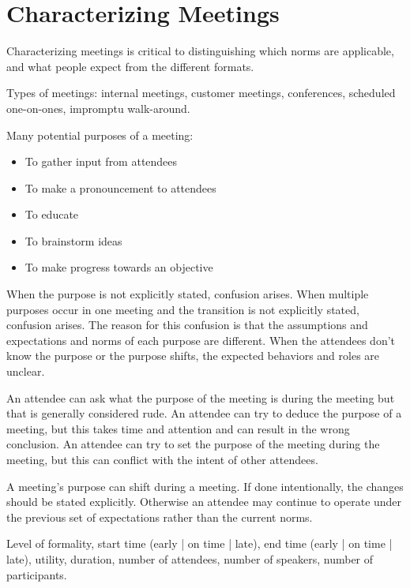 \section{Characterizing Meetings}
Characterizing meetings is critical to distinguishing which norms are applicable, and what people expect from the different formats. 



Types of meetings: internal meetings, customer meetings, conferences, scheduled one-on-ones, impromptu walk-around.   


Many potential purposes of a meeting:
\begin{itemize}
    \item To gather input from attendees
    \item To make a pronouncement to attendees
    \item To educate
    \item To brainstorm ideas
    \item To make progress towards an objective
\end{itemize}
When the purpose is not explicitly stated, confusion arises. 
When multiple purposes occur in one meeting and the transition is not explicitly stated, confusion arises.
The reason for this confusion is that the assumptions and expectations and norms of each purpose are different. When the attendees don't know the purpose or the purpose shifts, the expected behaviors and roles are unclear. 

An attendee can ask what the purpose of the meeting is during the meeting but that is generally considered rude. An attendee can try to deduce the purpose of a meeting, but this takes time and attention and can result in the wrong conclusion. An attendee can try to set the purpose of the meeting during the meeting, but this can conflict with the intent of other attendees. 

A meeting's purpose can shift during a meeting. If done intentionally, the changes should be stated explicitly. Otherwise an attendee may continue to operate under the previous set of expectations rather than the current norms. 



Level of formality, start time (early | on time | late), 
end time (early | on time | late), utility, 
duration, number of attendees, number of speakers, number of participants.



